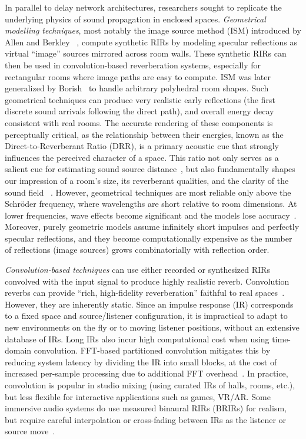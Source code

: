 \documentclass[journal]{IEEEtran}
\begin{document}
In parallel to delay network architectures, researchers sought to replicate the underlying physics of sound propagation in enclosed spaces. \emph{Geometrical modelling techniques}, most notably the image source method (ISM) introduced by Allen and Berkley ~\cite{allen_ism_79},
compute synthetic RIRs by modeling specular reflections as virtual “image” sources mirrored across room walls. These synthetic RIRs can then be used in convolution-based reverberation systems, especially for rectangular rooms where image paths are easy to compute.
ISM was later generalized by Borish~\cite{borish_84} to handle arbitrary polyhedral room shapes. 
Such geometrical techniques can produce very realistic early reflections (the first discrete sound arrivals following the direct path), and overall energy decay consistent with real rooms. 
The accurate rendering of these components is perceptually critical, as the relationship between their energies, known as the Direct-to-Reverberant Ratio (DRR), is a primary acoustic cue that strongly influences the perceived character of a space. This ratio not only serves as a salient cue for estimating sound source distance~\cite{neidhardt2021drr}, but also fundamentally shapes our impression of a room's size, its reverberant qualities, and the clarity of the sound field ~\cite{DRRGriesinger_2009,Zahorik2002, DRRchen2017}. However, geometrical techniques are most reliable only above the Schröder frequency, where wavelengths are short relative to room dimensions. At lower frequencies, wave effects become significant and the models lose accuracy~\cite{Savioja2015_overview}. Moreover, purely geometric models assume infinitely short impulses and
perfectly specular reflections, and they become computationally
expensive as the number of reflections (image sources) grows combinatorially with reflection order.

\emph{Convolution-based techniques} can use either recorded or synthesized RIRs convolved with the input signal to produce highly realistic reverb. 
Convolution reverbs can provide “rich, high-fidelity reverberation” faithful to real spaces~\cite{prawda_2020}. However, they are inherently static. Since an impulse response (IR) corresponds to a fixed space and source/listener configuration, it is impractical to adapt to new environments on the fly or to moving listener positions, without an extensive database of IRs.
Long IRs also incur high computational cost when using time-domain convolution. FFT-based partitioned convolution mitigates this by reducing system latency by dividing the IR into small blocks, at the cost of increased per-sample processing due to additional FFT overhead~\cite{Wefers2014}. In practice, convolution is popular in studio mixing (using curated IRs of halls, rooms, etc.), but less flexible for interactive applications such as games, VR/AR. Some immersive audio systems do use measured binaural RIRs (BRIRs) for realism, but require careful interpolation or cross-fading between IRs as the listener or source move~\cite{desenaEfficientSynthesisRoom2015}.
\end{document}
